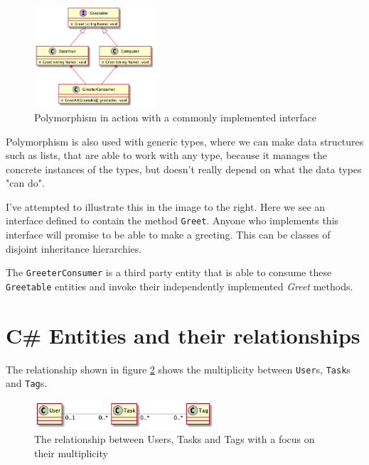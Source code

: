 \documentclass[12pt,letterpaper]{article}
\begin{document}
\begin{figure}
    \includegraphics[width=0.4\textwidth]{../out/Documents/plantuml/polymorphism/polymorphism.png}
    \caption{Polymorphism in action with a commonly implemented interface}
    \label{uml.polymorphism}
\end{figure}

Polymorphism is also used with generic types, where we can make data structures such as lists, that are able to work with any type, because it manages the concrete instances of the types, but doesn't really depend on what the data types "can do".

I've attempted to illustrate this in the image to the right. Here we see an interface defined to contain the method \texttt{Greet}. Anyone who implements this interface will promise to be able to make a greeting. This can be classes of disjoint inheritance hierarchies.

The \texttt{GreeterConsumer} is a third party entity that is able to consume these \texttt{Greetable} entities and invoke their independently implemented \textit{Greet} methods.

\pagebreak
\section*{C\# Entities and their relationships}

The relationship shown in figure \ref{uml.relationships.user-task-tag} shows the multiplicity between \texttt{User}s, \texttt{Task}s and \texttt{Tag}s.

\begin{figure}[h]
    \center
    \includegraphics[width=0.6\textwidth]{../out/Documents/plantuml/exercise2/exercise2.png}
    \caption{The relationship between Users, Tasks and Tags with a focus on their multiplicity}
    \label{uml.relationships.user-task-tag}
\end{figure}
\end{document}
